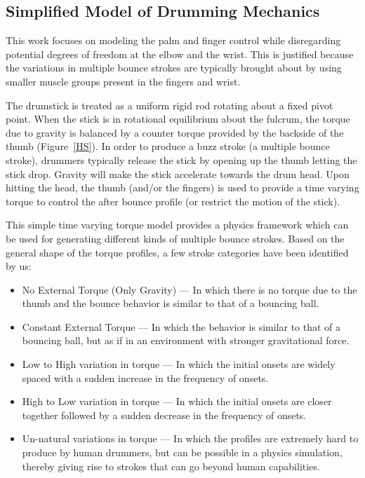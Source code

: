\documentclass[final,1p,times]{elsarticle}
\begin{document}
\subsection{Simplified Model of Drumming Mechanics}

This work focuses on modeling the palm and finger
control while disregarding potential degrees of freedom at the elbow and the wrist. This is justified because the variations in multiple bounce strokes are typically brought about by using smaller muscle groups present in the fingers and wrist. 

The drumstick is treated as a uniform rigid rod rotating about a fixed pivot point. When the stick is in rotational equilibrium about the fulcrum, the torque due to gravity is balanced by a counter torque provided by the backside of the thumb (Figure~\ref{HS}). In order to produce a buzz stroke (a multiple bounce stroke), drummers typically release the stick by opening up the thumb letting the stick drop. Gravity will make the stick accelerate towards the drum head. Upon hitting the head, the thumb (and/or the fingers) is used to provide a time varying torque to control the after bounce profile (or restrict the motion of the stick).

This simple time varying torque model provides a physics framework
which can be used for generating different kinds of multiple bounce strokes. Based on the general shape of the torque profiles, a few stroke categories have been identified by us:
\begin{itemize}
	\item No External Torque (Only Gravity) --- In which there is no torque due to the thumb and the bounce behavior is similar to that of a bouncing ball.
	\item Constant External Torque --- In which the behavior is similar to that of a bouncing ball, but as if in an environment with stronger gravitational force. 
	\item Low to High variation in torque --- In which the initial onsets are widely spaced with a sudden increase in the frequency of onsets. 
	\item High to Low variation in torque --- In which the initial onsets are closer together followed by a sudden decrease in the frequency of onsets.
	\item Un-natural variations in torque --- In which the profiles are extremely hard to produce by human drummers, but can be possible in a physics simulation, thereby giving rise to strokes that can go beyond human capabilities.
\end{itemize}
\end{document}
